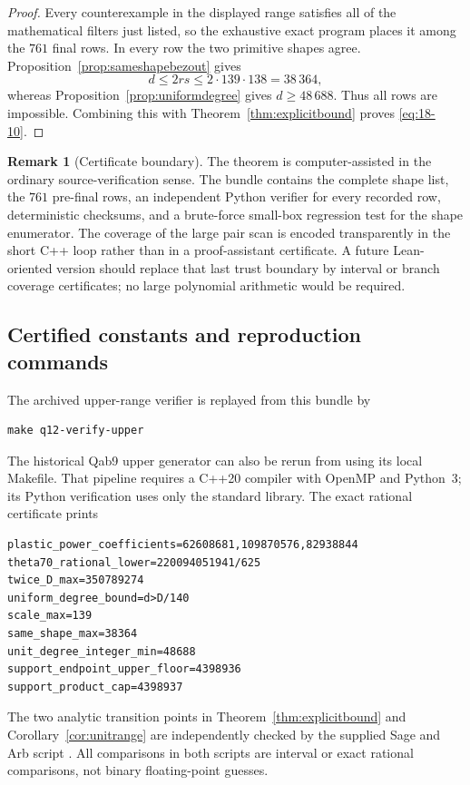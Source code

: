 \documentclass[11pt]{article}
\numberwithin{equation}{section}
\theoremstyle{definition}
\newtheorem{remark}[theorem]{Remark}
\begin{document}
\begin{proof}
Every counterexample in the displayed range satisfies all of the
mathematical filters just listed, so the exhaustive exact program places it
among the \(761\) final rows.  In every row the two primitive shapes agree.
Proposition~\ref{prop:sameshapebezout} gives
\[
 d\leq2rs\leq2\cdot139\cdot138=38\,364,
\]
whereas Proposition~\ref{prop:uniformdegree} gives \(d\geq48\,688\).  Thus
all rows are impossible.  Combining this with
Theorem~\ref{thm:explicitbound} proves \eqref{eq:18-10}.
\end{proof}

\begin{remark}[Certificate boundary]
The theorem is computer-assisted in the ordinary source-verification sense.
The bundle contains the complete shape list, the \(761\) pre-final rows, an
independent Python verifier for every recorded row, deterministic checksums,
and a brute-force small-box regression test for the shape enumerator.  The
coverage of the large pair scan is encoded transparently in the short C++
loop rather than in a proof-assistant certificate.  A future Lean-oriented
version should replace that last trust boundary by interval or branch
coverage certificates; no large polynomial arithmetic would be required.
\end{remark}

\subsection{Certified constants and reproduction commands}

The archived upper-range verifier is replayed from this bundle by
\begin{lstlisting}[basicstyle=\ttfamily\footnotesize]
make q12-verify-upper
\end{lstlisting}
The historical Qab9 upper generator can also be rerun from
 using its local Makefile.  That pipeline
requires a C++20 compiler with OpenMP and Python~3; its Python verification
uses only the standard library.  The exact rational certificate
 prints
\begin{lstlisting}[basicstyle=\ttfamily\scriptsize]
plastic_power_coefficients=62608681,109870576,82938844
theta70_rational_lower=220094051941/625
twice_D_max=350789274
uniform_degree_bound=d>D/140
scale_max=139
same_shape_max=38364
unit_degree_integer_min=48688
support_endpoint_upper_floor=4398936
support_product_cap=4398937
\end{lstlisting}
The two analytic transition points in Theorem~\ref{thm:explicitbound} and
Corollary~\ref{cor:unitrange} are independently checked by the supplied Sage
and Arb script .  All comparisons in
both scripts are interval or exact rational comparisons, not binary
floating-point guesses.
\end{document}
